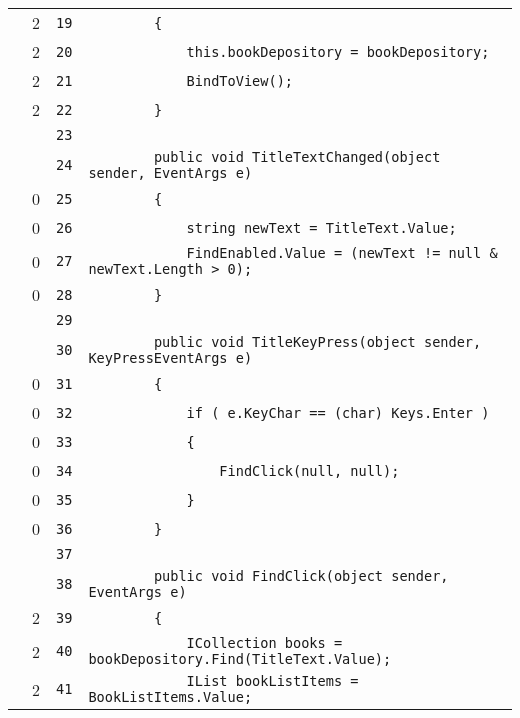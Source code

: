 \documentclass[a4paper,10pt]{article}
\begin{document}
\begin{longtable}[l]{lrrl}
\cellcolor{green} & 2 & \verb~19~ & \verb~        {~\\
\cellcolor{green} & 2 & \verb~20~ & \verb~            this.bookDepository = bookDepository;~\\
\cellcolor{green} & 2 & \verb~21~ & \verb~            BindToView();~\\
\cellcolor{green} & 2 & \verb~22~ & \verb~        }~\\
\cellcolor{gray} &  & \verb~23~ & \verb~~\\
\cellcolor{gray} &  & \verb~24~ & \verb~        public void TitleTextChanged(object sender, EventArgs e)~\\
\cellcolor{red} & 0 & \verb~25~ & \verb~        {~\\
\cellcolor{red} & 0 & \verb~26~ & \verb~            string newText = TitleText.Value;~\\
\cellcolor{red} & 0 & \verb~27~ & \verb~            FindEnabled.Value = (newText != null & newText.Length > 0);~\\
\cellcolor{red} & 0 & \verb~28~ & \verb~        }~\\
\cellcolor{gray} &  & \verb~29~ & \verb~~\\
\cellcolor{gray} &  & \verb~30~ & \verb~        public void TitleKeyPress(object sender, KeyPressEventArgs e)~\\
\cellcolor{red} & 0 & \verb~31~ & \verb~        {~\\
\cellcolor{red} & 0 & \verb~32~ & \verb~            if ( e.KeyChar == (char) Keys.Enter )~\\
\cellcolor{red} & 0 & \verb~33~ & \verb~            {~\\
\cellcolor{red} & 0 & \verb~34~ & \verb~                FindClick(null, null);~\\
\cellcolor{red} & 0 & \verb~35~ & \verb~            }~\\
\cellcolor{red} & 0 & \verb~36~ & \verb~        }~\\
\cellcolor{gray} &  & \verb~37~ & \verb~~\\
\cellcolor{gray} &  & \verb~38~ & \verb~        public void FindClick(object sender, EventArgs e)~\\
\cellcolor{green} & 2 & \verb~39~ & \verb~        {~\\
\cellcolor{green} & 2 & \verb~40~ & \verb~            ICollection books = bookDepository.Find(TitleText.Value);~\\
\cellcolor{green} & 2 & \verb~41~ & \verb~            IList bookListItems = BookListItems.Value;~\\

\end{longtable}
\end{document}
